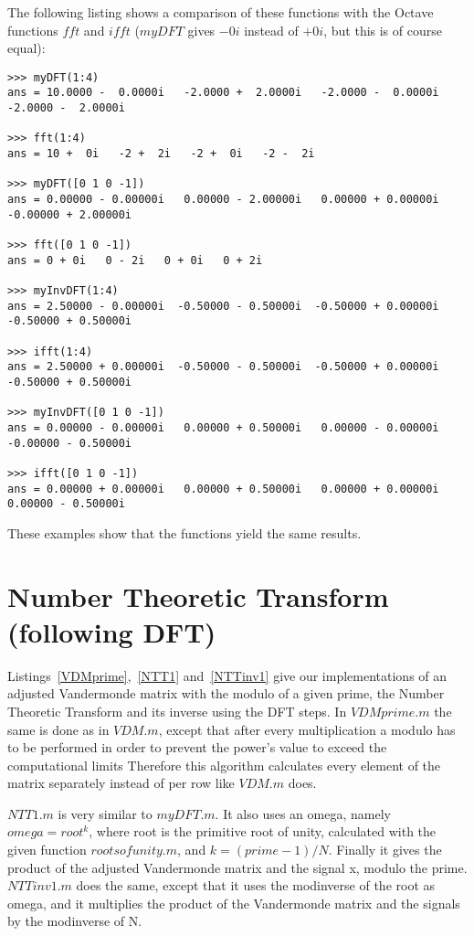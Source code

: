 \documentclass{article}
\begin{document}
The following listing shows a comparison of these functions with the Octave functions $fft$ and $ifft$ ($myDFT$ gives $-0i$ instead of $+0i$, but this is of course equal):

\begin{lstlisting}
>>> myDFT(1:4)
ans = 10.0000 -  0.0000i   -2.0000 +  2.0000i   -2.0000 -  0.0000i   -2.0000 -  2.0000i

>>> fft(1:4)
ans = 10 +  0i   -2 +  2i   -2 +  0i   -2 -  2i

>>> myDFT([0 1 0 -1])
ans = 0.00000 - 0.00000i   0.00000 - 2.00000i   0.00000 + 0.00000i   -0.00000 + 2.00000i

>>> fft([0 1 0 -1])
ans = 0 + 0i   0 - 2i   0 + 0i   0 + 2i

>>> myInvDFT(1:4)
ans = 2.50000 - 0.00000i  -0.50000 - 0.50000i  -0.50000 + 0.00000i   -0.50000 + 0.50000i

>>> ifft(1:4)
ans = 2.50000 + 0.00000i  -0.50000 - 0.50000i  -0.50000 + 0.00000i   -0.50000 + 0.50000i

>>> myInvDFT([0 1 0 -1])
ans = 0.00000 - 0.00000i   0.00000 + 0.50000i   0.00000 - 0.00000i   -0.00000 - 0.50000i

>>> ifft([0 1 0 -1])
ans = 0.00000 + 0.00000i   0.00000 + 0.50000i   0.00000 + 0.00000i    0.00000 - 0.50000i
\end{lstlisting}
These examples show that the functions yield the same results.

 
 
 

\section{Number Theoretic Transform (following DFT)}
Listings~\ref{VDMprime},~\ref{NTT1} and~\ref{NTTinv1} give our implementations of
an adjusted Vandermonde matrix with the modulo of a given prime,
the Number Theoretic Transform and its inverse using the DFT steps.
In $VDMprime.m$ the same is done as in $VDM.m$,
except that after every multiplication a modulo has to be performed
in order to prevent the power's value to exceed the computational limits
Therefore this algorithm calculates every element of the matrix separately instead of per row like $VDM.m$ does.

$NTT1.m$ is very similar to $myDFT.m$.
 It also uses an omega, namely $omega = root^k$,
 where root is the primitive root of unity,
 calculated with the given function $rootsofunity.m$, and $k = (prime - 1)/N$.
 Finally it gives the product of the adjusted Vandermonde matrix and the signal x, modulo the prime.
 $NTTinv1.m$ does the same, except that it uses the modinverse of the root as omega,
and it multiplies the product of the Vandermonde matrix and the signals by the modinverse of N.
\end{document}
